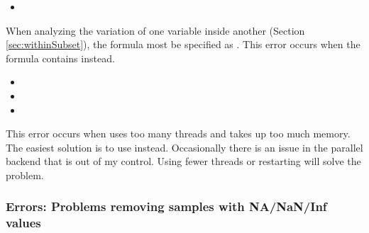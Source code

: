 \documentclass[12pt]{article}\usepackage[]{graphicx}\usepackage[]{xcolor}
\begin{document}
\begin{itemize}
  \item {}
\end{itemize}
When analyzing the variation of one variable inside another (Section \ref{sec:withinSubset}), the formula most be specified as .  This error occurs when the formula contains  instead.\\

\begin{itemize}
  \item {}
  \item {}
  \item {}
\end{itemize}
 This error occurs when  uses too many threads and takes up too much memory.  The easiest solution is to use  instead.  Occasionally there is an issue in the parallel backend that is out of my control.  Using fewer threads or restarting \R{} will solve the problem. 

\subsubsection{Errors: Problems removing samples with NA/NaN/Inf values}
\end{document}
